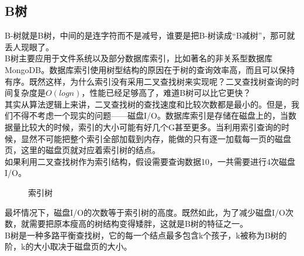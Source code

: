 \subsection{B树}

B-树就是B树，中间的是连字符而不是减号，谁要是把B-树读成“B减树”，那可就丢人现眼了。 \\

B树主要应用于文件系统以及部分数据库索引，比如著名的非关系型数据库MongoDB。数据库索引使用树型结构的原因在于树的查询效率高，而且可以保持有序。既然这样，为什么索引没有采用二叉查找树来实现呢？二叉查找树查询的时间复杂度是$ O(logn) $，性能已经足够高了，难道B树可以比它更快？ \\

其实从算法逻辑上来讲，二叉查找树的查找速度和比较次数都是最小的。但是，我们不得不考虑一个现实的问题——磁盘I/O。数据库索引是存储在磁盘上的，当数据量比较大的时候，索引的大小可能有好几个G甚至更多。当利用索引查询的时候，显然不可能把整个索引全部加载到内存，能做的只有逐一加载每一页的磁盘页，这里的磁盘页就对应着索引树的结点。 \\

如果利用二叉查找树作为索引结构，假设需要查询数据10，一共需要进行4次磁盘I/O。 \\

\begin{figure}[H]
	\centering
	\caption{索引树}
\end{figure}

最坏情况下，磁盘I/O的次数等于索引树的高度。既然如此，为了减少磁盘I/O次数，就需要把原本瘦高的树结构变得矮胖，这就是B树的特征之一。 \\

B树是一种多路平衡查找树，它的每一个结点最多包含k个孩子，k被称为B树的阶，k的大小取决于磁盘页的大小。 \\


